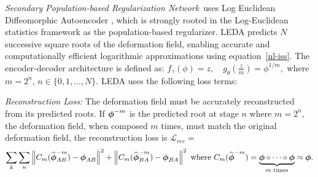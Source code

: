 \vspace{0.05in}
\noindent \textit{Secondary Population-based Regularization Network}~uses Log Euclidean Diffeomorphic Autoencoder \cite{iyer2024leda}, which is strongly rooted in the Log-Euclidean statistics framework as the population-based regularizer. LEDA predicts \(N\) successive square roots of the deformation field, enabling accurate and computationally efficient logarithmic approximations using equation~\ref{nl-iss}. The encoder-decoder architecture is defined as:
\(
f_{\gamma}(\phi) = z, \quad g_{\theta}\left(\frac{z}{m}\right) = \phi^{1/m}, \) where \(m = 2^n, \, n \in \{0, 1, \dots, N\}\).
LEDA uses the following loss terms:

\vspace{0.05in}
\noindent \textit{Reconstruction Loss:} The deformation field must be accurately reconstructed from its predicted roots. If \({\boldsymbol{\phi}}^{-m} \) is the predicted root at stage \(n\) where \(m = {2}^n\), the deformation field, when composed \(m\) times, must match the original deformation field, the reconstruction loss is \(\mathcal{L}_{rec} = \)
\begin{equation}
    \sum_k \sum_n \left\|C_m(\widehat{{\boldsymbol{\phi}}}_{AB}^{-m}) - {\boldsymbol{\phi}}_{AB}\right\|^2 + \left\|C_m(\widehat{{\boldsymbol{\phi}}}_{BA}^{-m}) - {\boldsymbol{\phi}}_{BA}\right\|^2 \text{ where } C_m(\widehat{{\boldsymbol{\phi}}}^{-m}) = \underbrace{{\boldsymbol{\phi}} \circ \dots \circ {\boldsymbol{\phi}}}_{m \text{ times}} \approx {\boldsymbol{\phi}}.
\end{equation}

